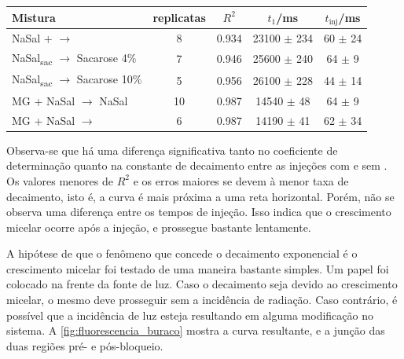 	\begin{table}[h]
		{%
			\begin{tabular}{p{4cm} c c c c}
				\toprule
				Mistura                                        & replicatas & \(R^2\) & \(t_1\)/ms        & \(t_{\mathrm{inj}}\)/ms \\ \midrule
				NaSal + \agua{} \(\to\) \agua                  & 8          & 0.934   & 23100 \(\pm\) 234 & 60 \(\pm\) 24           \\
				NaSal\textsubscript{sac} \(\to\) Sacarose 4\%  & 7          & 0.946   & 25600 \(\pm\) 240 & 64 \(\pm\) 9            \\
				NaSal\textsubscript{sac} \(\to\) Sacarose 10\% & 5          & 0.956   & 26100 \(\pm\) 228 & 44 \(\pm\) 14           \\ \midrule
				MG + NaSal \(\to\) NaSal                       & 10         & 0.987   & 14540 \(\pm\) 48  & 64 \(\pm\) 9            \\
				MG + NaSal \(\to\) \agua                       & 6          & 0.987   & 14190 \(\pm\) 41  & 62 \(\pm\) 34           \\ \bottomrule
			\end{tabular}
		}{}
	\end{table} 
	
	Observa-se que há uma diferença significativa tanto no coeficiente de determinação quanto na constante de decaimento entre as injeções com e sem \TTAB{}. Os valores menores de \(R^2\) e os erros maiores se devem à menor taxa de decaimento, isto é, a curva é mais próxima a uma reta horizontal.  Porém, não se observa uma diferença entre os tempos de injeção. Isso indica que o crescimento micelar ocorre após a injeção, e prossegue bastante lentamente.
	
	A hipótese de que o fenômeno que concede o decaimento exponencial é o crescimento micelar foi testado de uma maneira bastante simples. Um papel foi colocado na frente da fonte de luz. Caso o decaimento seja devido ao crescimento micelar, o mesmo deve prosseguir sem a incidência de radiação. Caso contrário, é possível que a incidência de luz esteja resultando em alguma modificação no sistema. A \autoref{fig:fluorescencia_buraco} mostra a curva resultante, e a junção das duas regiões pré- e pós-bloqueio.
	
